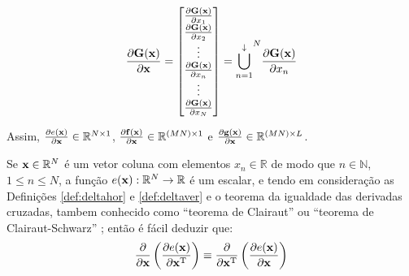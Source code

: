 \begin{definition}
\begin{equation}
\frac{\partial \MATRIX{G}(\VECTOR{x}) }{\partial \VECTOR{x}}= 
\left[
\begin{matrix}
\frac{\partial \MATRIX{G}(\VECTOR{x}) }{\partial x_{1}} \\
\frac{\partial \MATRIX{G}(\VECTOR{x}) }{\partial x_{2}} \\
\vdots \\
\frac{\partial \MATRIX{G}(\VECTOR{x}) }{\partial x_{n}} \\
\vdots \\
\frac{\partial \MATRIX{G}(\VECTOR{x}) }{\partial x_{N}}
\end{matrix}
\right] = {\bigcup\limits_{n=1}^{\downarrow}}^{N}{\frac{\partial \MATRIX{G}(\VECTOR{x}) }{\partial x_{n}}}
\end{equation}

Assim, 
$\frac{\partial e(\VECTOR{x}) }{\partial \VECTOR{x}} \in \mathbb{R}^{N \times 1}$,
$\frac{\partial \VECTOR{f}(\VECTOR{x}) }{\partial \VECTOR{x}} \in \mathbb{R}^{(MN) \times 1}$ e
$\frac{\partial \VECTOR{g}(\VECTOR{x}) }{\partial \VECTOR{x}} \in \mathbb{R}^{(MN) \times L}$.
\end{definition}


\begin{corollary}\label{cor:derder}
Se 
$\VECTOR{x}\in \mathbb{R}^N$ é um vetor coluna com elementos $x_n\in \mathbb{R}$ de modo que
$n\in \mathbb{N}$, $1 \leq n \leq N$, 
a função $e(\VECTOR{x}): \mathbb{R}^N \rightarrow \mathbb{R}$ é um escalar,
e tendo em consideração as Definições \ref{def:deltahor} e \ref {def:deltaver} e o 
teorema da igualdade das derivadas cruzadas, 
tambem conhecido como ``teorema de Clairaut'' \cite[pp. 885]{stewart2008calculus}
ou ``teorema de Clairaut-Schwarz'' \cite[pp. 311]{telles2015matematica}; 
então é fácil deduzir que:
\begin{equation}
 \frac{\partial }{\partial \VECTOR{x}} \left( \frac{\partial e(\VECTOR{x} )}{\partial \VECTOR{x}^{\transpose}} \right) \equiv \frac{\partial }{\partial \VECTOR{x}^{\transpose}} \left( \frac{\partial e(\VECTOR{x} )}{\partial \VECTOR{x}} \right)
\end{equation}
\end{corollary}

